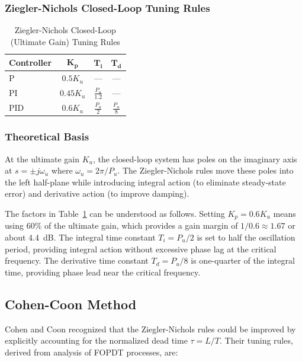 \subsubsection{Ziegler-Nichols Closed-Loop Tuning Rules}

\begin{table}[htbp]
\centering
\caption{Ziegler-Nichols Closed-Loop (Ultimate Gain) Tuning Rules}
\label{tab:zn_closed_loop}
\begin{tabular}{lccc}
\toprule
\textbf{Controller} & $\boldsymbol{K_p}$ & $\boldsymbol{T_i}$ & $\boldsymbol{T_d}$ \\
\midrule
P & $0.5 K_u$ & --- & --- \\[1ex]
PI & $0.45 K_u$ & $\displaystyle\frac{P_u}{1.2}$ & --- \\[2ex]
PID & $0.6 K_u$ & $\displaystyle\frac{P_u}{2}$ & $\displaystyle\frac{P_u}{8}$ \\
\bottomrule
\end{tabular}
\end{table}

\subsubsection{Theoretical Basis}

At the ultimate gain $K_u$, the closed-loop system has poles on the imaginary axis at $s = \pm j\omega_u$ where $\omega_u = 2\pi/P_u$. The Ziegler-Nichols rules move these poles into the left half-plane while introducing integral action (to eliminate steady-state error) and derivative action (to improve damping).

The factors in Table~\ref{tab:zn_closed_loop} can be understood as follows. Setting $K_p = 0.6 K_u$ means using 60\% of the ultimate gain, which provides a gain margin of $1/0.6 \approx 1.67$ or about 4.4~dB. The integral time constant $T_i = P_u/2$ is set to half the oscillation period, providing integral action without excessive phase lag at the critical frequency. The derivative time constant $T_d = P_u/8$ is one-quarter of the integral time, providing phase lead near the critical frequency.

\subsection{Cohen-Coon Method}

Cohen and Coon recognized that the Ziegler-Nichols rules could be improved by explicitly accounting for the normalized dead time $\tau = L/T$. Their tuning rules, derived from analysis of FOPDT processes, are:

